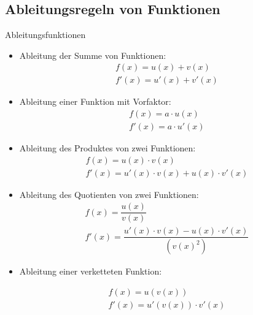 \subsection{Ableitungsregeln von Funktionen}
\begin{defi}{Ableitungsfunktionen}{}\label{AbleitungEFunktion}
\begin{multicols}{2}
\begin{itemize}
    \item Ableitung der Summe von Funktionen:
    \begin{gather*} 
	f(x) = u(x) + v(x) \\
	f'(x) = u'(x)+ v'(x)
	\end{gather*}
     \item Ableitung einer Funktion mit Vorfaktor:
    \begin{gather*} 
	f(x) = a\cdot u(x)  \\
	f'(x) = a\cdot u'(x) 
	\end{gather*}
       \item Ableitung des Produktes von zwei Funktionen:
    \begin{gather*} 
	f(x) = u(x) \cdot v(x)  \\
	f'(x) = u'(x) \cdot v(x) + u(x) \cdot v'(x)
	\end{gather*}     
        \item Ableitung des Quotienten von zwei Funktionen:
    \begin{gather*} 
	f(x) = \dfrac{u(x)}{v(x)}  \\
	f'(x) = \dfrac{u'(x)\cdot v(x) - u(x) \cdot v'(x)}{(v(x)^2)}
	\end{gather*} 
         \item Ableitung einer verketteten Funktion:

   \begin{gather*} 
	f(x) = u(v(x))  \\
	f'(x) = u'(v(x)) \cdot v'(x)
	\end{gather*} 

\end{itemize}   
\end{multicols}
\end{defi}
